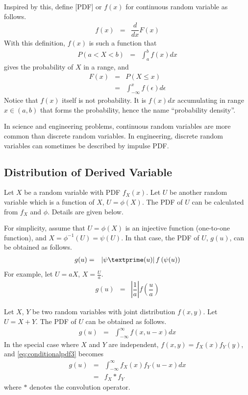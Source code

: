 Inspired by this, define [PDF] or $f(x)$ for continuous random variable as follows. 
\begin{eqnarray}
f(x) &=& \dfrac{d}{dx}F(x) \nonumber
\end{eqnarray}
With this definition, $f(x)$ is such a function that
\begin{eqnarray}
  P(a < X < b) &=& \int_{a}^{b}f(x)dx \nonumber
\end{eqnarray}
gives the probability of $X$ in a range, and
\begin{eqnarray}
  F(x) &=& P(X\leq x) \nonumber \\
  &=& \int_{-\infty}^{x} f(\epsilon)d\epsilon \nonumber
\end{eqnarray}
Notice that $f(x)$ itself is not probability. It is $f(x)dx$ accumulating in range $x \in (a, b)$ that forms the probability, hence the name ``probability density''.

In science and engineering problems, continuous random variables are more common than discrete random variables. In engineering, discrete random variables can sometimes be described by impulse PDF.

\subsection{Distribution of Derived Variable}

Let $X$ be a random variable with PDF $f_X(x)$. Let $U$ be another random variable which is a function of $X$, $U=\phi(X)$. The PDF of $U$ can be calculated from $f_X$ and $\phi$. Details are given below.

For simplicity, assume that $U=\phi(X)$ is an injective function (one-to-one function), and $X=\phi^{-1}(U)=\psi(U)$. In that case, the PDF of $U$, $g(u)$, can be obtained as follows.
\begin{eqnarray}
	g(u) &=& \left|\psi\textprime(u)\right|f\left(\psi(u)\right) \nonumber
\end{eqnarray}
For example, let $U=aX$, $X=\frac{U}{a}$.
\begin{eqnarray}
	g(u) &=& \left|\dfrac{1}{a}\right|f\left(\dfrac{u}{a}\right) \nonumber
\end{eqnarray}

Let $X$, $Y$ be two random variables with joint distribution $f(x, y)$. Let $U=X+Y$. The PDF of $U$ can be obtained as follows.
\begin{eqnarray}
	g(u) &=& \int_{-\infty}^{\infty} f(x, u-x)dx \label{eq:conditionalpdf3}
\end{eqnarray}
In the special case where $X$ and $Y$ are independent, $f(x, y) = f_X(x)f_Y(y)$, and \eqref{eq:conditionalpdf3} becomes
\begin{eqnarray}
	g(u) &=& \int_{-\infty}^{\infty} f_X(x)f_Y(u-x)dx \nonumber \\
	&=& f_X * f_Y \nonumber
\end{eqnarray}
where $*$ denotes the convolution operator.

